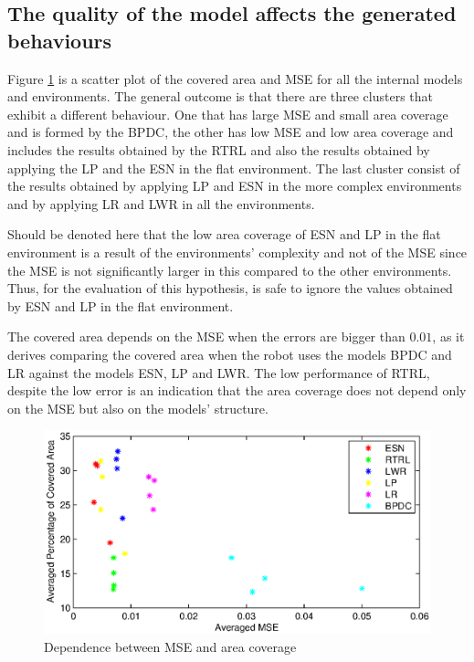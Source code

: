 \documentclass[msc,ai,logo]{infthesis}
\begin{document}
\subsection*{The quality of the model affects the generated behaviours}

Figure \ref{fig:Area_Error} is a scatter plot of the covered area and MSE for all the internal models and environments. The general outcome is that there are three clusters that exhibit a different behaviour. One that has large MSE and small area coverage and is formed by the BPDC, the other has low MSE and low area coverage and includes the results obtained by the RTRL and also the results obtained by applying the LP and the ESN in the flat environment. The last cluster consist of the results obtained by applying LP and ESN in the more complex environments and by applying LR and LWR in all the environments.

Should be denoted here that the low area coverage of ESN and LP in the flat environment is a result of the environments' complexity and not of the MSE since the MSE is not significantly larger in this compared to the other environments. Thus, for the evaluation of this hypothesis, is safe to ignore the values obtained by ESN and LP in the flat environment.

The covered area depends on the MSE when the errors are bigger than $0.01$, as it derives comparing the covered area when the robot uses the models BPDC and LR against the models ESN, LP and LWR. The low performance of RTRL, despite the low error is an indication that the area coverage does not depend only on the MSE but also on the models' structure.  


\begin{figure}[H]
\includegraphics[scale=0.8]{Area_Error.eps}
\centering
\caption{Dependence between MSE and area coverage }
\label{fig:Area_Error}
\end{figure}
\end{document}
